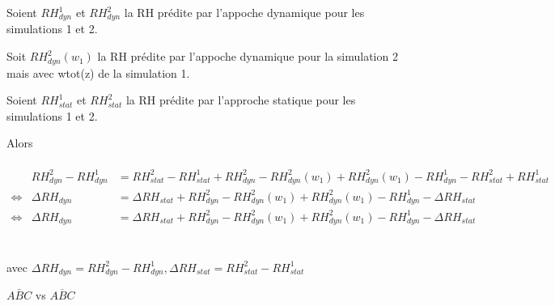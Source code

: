 \documentclass{article}
\begin{document}
\begin{list}{}{}
    \item Soient $RH_{dyn}^1$ et $RH_{dyn}^2$ la RH prédite par l'appoche dynamique pour les simulations 1 et 2. \\
    \item Soit $RH_{dyn}^2(w_1)$ la RH prédite par l'appoche dynamique pour la simulation 2 mais avec wtot(z) de la simulation 1. \\
    \item Soient $RH_{stat}^1$ et $RH_{stat}^2$ la RH prédite par l'approche statique pour les simulations 1 et 2. 
\end{list}

Alors
~\\
~\\
\begin{eqnarray*}
    & RH_{dyn}^2-RH_{dyn}^1 &= RH_{stat}^2-RH_{stat}^1 + RH_{dyn}^2-RH_{dyn}^2(w_1) + RH_{dyn}^2(w_1)-RH_{dyn}^1-RH_{stat}^2+RH_{stat}^1 \\ \Leftrightarrow
    &\Delta RH_{dyn} &= \Delta RH_{stat} + RH_{dyn}^2-RH_{dyn}^2(w_1) + RH_{dyn}^2(w_1)-RH_{dyn}^1-\Delta RH_{stat} \\ \Leftrightarrow
    &\Delta RH_{dyn} &= \Delta RH_{stat} + RH_{dyn}^2-RH_{dyn}^2(w_1) + RH_{dyn}^2(w_1)-RH_{dyn}^1-\Delta RH_{stat}
\end{eqnarray*}
~\\
~\\
avec $\Delta RH_{dyn} = RH_{dyn}^2-RH_{dyn}^1, \Delta RH_{stat} = RH_{stat}^2-RH_{stat}^1$

$\bar{ABC}$ vs $\overline{ABC}$
\end{document}
